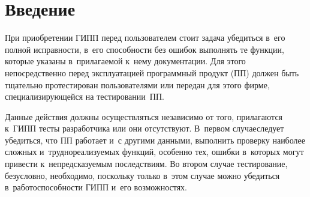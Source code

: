      
  
\vspace*{-4pt}



\thispagestyle{headings}

\begin{multicols}{2}

\label{st\stat}
     
\section{Введение}

    При приобретении ГИПП перед пользователем стоит задача убедиться в~его полной 
исправности, в~его способности без ошибок выполнять те функции, которые 
указаны в~прилагаемой к~нему документации. Для этого непосредственно 
перед эксплуатацией программный продукт (ПП) должен быть тщательно 
протестирован пользователями или передан для этого фирме, 
специализирующейся на тестировании~ПП.
    
    Данные действия должны осуществляться независимо от того, 
прилагаются к~ГИПП тесты разработчика или они отсутствуют. В~первом 
случае\linebreak следует убедиться, что ПП работает и~с другими данными, выполнить 
проверку наиболее сложных и~труднореализуемых функций, особенно тех, 
ошибки в~которых могут привести к~непредсказуемым последствиям. Во 
втором случае тестирование, безусловно, необходимо, поскольку только 
в~этом случае можно убедиться в~ра\-бо\-то\-спо\-соб\-ности ГИПП и~его 
возможностях.
    

\end{multicols}
